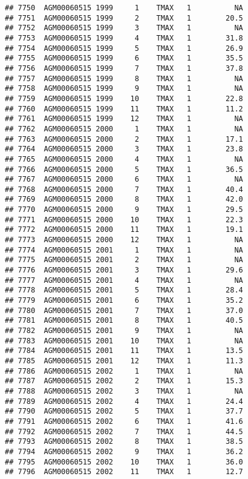 \documentclass{article}\usepackage[]{graphicx}\usepackage[]{color}
\makeatletter
\newenvironment{kframe}{%
 \def\at@end@of@kframe{}%
 \ifinner\ifhmode%
  \def\at@end@of@kframe{\end{minipage}}%
  \begin{minipage}{\columnwidth}%
 \fi\fi%
 \def\FrameCommand##1{\hskip\@totalleftmargin \hskip-\fboxsep
 \colorbox{shadecolor}{##1}\hskip-\fboxsep
     \hskip-\linewidth \hskip-\@totalleftmargin \hskip\columnwidth}%
 \MakeFramed {\advance\hsize-\width
   \@totalleftmargin\z@ \linewidth\hsize
   \@setminipage}}%
 {\par\unskip\endMakeFramed%
 \at@end@of@kframe}
\newenvironment{knitrout}{}{} %
\makeatother
\begin{document}
\begin{knitrout}
\begin{kframe}
\begin{verbatim}
## 7750  AGM00060515 1999     1    TMAX   1          NA
## 7751  AGM00060515 1999     2    TMAX   1        20.5
## 7752  AGM00060515 1999     3    TMAX   1          NA
## 7753  AGM00060515 1999     4    TMAX   1        31.8
## 7754  AGM00060515 1999     5    TMAX   1        26.9
## 7755  AGM00060515 1999     6    TMAX   1        35.5
## 7756  AGM00060515 1999     7    TMAX   1        37.8
## 7757  AGM00060515 1999     8    TMAX   1          NA
## 7758  AGM00060515 1999     9    TMAX   1          NA
## 7759  AGM00060515 1999    10    TMAX   1        22.8
## 7760  AGM00060515 1999    11    TMAX   1        11.2
## 7761  AGM00060515 1999    12    TMAX   1          NA
## 7762  AGM00060515 2000     1    TMAX   1          NA
## 7763  AGM00060515 2000     2    TMAX   1        17.1
## 7764  AGM00060515 2000     3    TMAX   1        23.8
## 7765  AGM00060515 2000     4    TMAX   1          NA
## 7766  AGM00060515 2000     5    TMAX   1        36.5
## 7767  AGM00060515 2000     6    TMAX   1          NA
## 7768  AGM00060515 2000     7    TMAX   1        40.4
## 7769  AGM00060515 2000     8    TMAX   1        42.0
## 7770  AGM00060515 2000     9    TMAX   1        29.5
## 7771  AGM00060515 2000    10    TMAX   1        22.3
## 7772  AGM00060515 2000    11    TMAX   1        19.1
## 7773  AGM00060515 2000    12    TMAX   1          NA
## 7774  AGM00060515 2001     1    TMAX   1          NA
## 7775  AGM00060515 2001     2    TMAX   1          NA
## 7776  AGM00060515 2001     3    TMAX   1        29.6
## 7777  AGM00060515 2001     4    TMAX   1          NA
## 7778  AGM00060515 2001     5    TMAX   1        28.4
## 7779  AGM00060515 2001     6    TMAX   1        35.2
## 7780  AGM00060515 2001     7    TMAX   1        37.0
## 7781  AGM00060515 2001     8    TMAX   1        40.5
## 7782  AGM00060515 2001     9    TMAX   1          NA
## 7783  AGM00060515 2001    10    TMAX   1          NA
## 7784  AGM00060515 2001    11    TMAX   1        13.5
## 7785  AGM00060515 2001    12    TMAX   1        11.3
## 7786  AGM00060515 2002     1    TMAX   1          NA
## 7787  AGM00060515 2002     2    TMAX   1        15.3
## 7788  AGM00060515 2002     3    TMAX   1          NA
## 7789  AGM00060515 2002     4    TMAX   1        24.4
## 7790  AGM00060515 2002     5    TMAX   1        37.7
## 7791  AGM00060515 2002     6    TMAX   1        41.6
## 7792  AGM00060515 2002     7    TMAX   1        44.5
## 7793  AGM00060515 2002     8    TMAX   1        38.5
## 7794  AGM00060515 2002     9    TMAX   1        36.2
## 7795  AGM00060515 2002    10    TMAX   1        36.0
## 7796  AGM00060515 2002    11    TMAX   1        12.7

\end{verbatim}
\end{kframe}
\end{knitrout}
\end{document}
